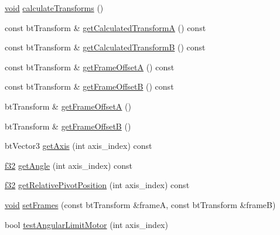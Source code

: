 \begin{DoxyCompactItemize}
\item 
\mbox{\hyperlink{_thread_8h_af1e856da2e658414cb2456cb6f7ebc66}{void}} \mbox{\hyperlink{classnjli_1_1_physics_constraint_generic6_dof_a120abacab53cf4dcf4b97241dc8a59b8}{calculate\+Transforms}} ()
\item 
const bt\+Transform \& \mbox{\hyperlink{classnjli_1_1_physics_constraint_generic6_dof_ae240be2b376857039701ff15e7304c94}{get\+Calculated\+TransformA}} () const
\item 
const bt\+Transform \& \mbox{\hyperlink{classnjli_1_1_physics_constraint_generic6_dof_a62448d0b780fa3c40b7d8a3b38458533}{get\+Calculated\+TransformB}} () const
\item 
const bt\+Transform \& \mbox{\hyperlink{classnjli_1_1_physics_constraint_generic6_dof_a47e2abdae640363408d6b65abe8abeac}{get\+Frame\+OffsetA}} () const
\item 
const bt\+Transform \& \mbox{\hyperlink{classnjli_1_1_physics_constraint_generic6_dof_a9831341ba2e4ed3fda9f4c0daf48bd03}{get\+Frame\+OffsetB}} () const
\item 
bt\+Transform \& \mbox{\hyperlink{classnjli_1_1_physics_constraint_generic6_dof_a5c522c9fc645e001c74d78d435fc31a9}{get\+Frame\+OffsetA}} ()
\item 
bt\+Transform \& \mbox{\hyperlink{classnjli_1_1_physics_constraint_generic6_dof_a2f64146e62a92c8aca2127a3e9038084}{get\+Frame\+OffsetB}} ()
\item 
bt\+Vector3 \mbox{\hyperlink{classnjli_1_1_physics_constraint_generic6_dof_a3cada42a66e9341e7fb75e3bedab031b}{get\+Axis}} (int axis\+\_\+index) const
\item 
\mbox{\hyperlink{_util_8h_a5f6906312a689f27d70e9d086649d3fd}{f32}} \mbox{\hyperlink{classnjli_1_1_physics_constraint_generic6_dof_ae933d3bad2ab5614a25c8afbc79eda7a}{get\+Angle}} (int axis\+\_\+index) const
\item 
\mbox{\hyperlink{_util_8h_a5f6906312a689f27d70e9d086649d3fd}{f32}} \mbox{\hyperlink{classnjli_1_1_physics_constraint_generic6_dof_a80989ad0ca61c764fc63c9404229cbd6}{get\+Relative\+Pivot\+Position}} (int axis\+\_\+index) const
\item 
\mbox{\hyperlink{_thread_8h_af1e856da2e658414cb2456cb6f7ebc66}{void}} \mbox{\hyperlink{classnjli_1_1_physics_constraint_generic6_dof_ad0fd838dfb528aa5d473236951452a93}{set\+Frames}} (const bt\+Transform \&frameA, const bt\+Transform \&frameB)
\item 
bool \mbox{\hyperlink{classnjli_1_1_physics_constraint_generic6_dof_a510f7c50e1db34da7587e29be21cd95c}{test\+Angular\+Limit\+Motor}} (int axis\+\_\+index)

\end{DoxyCompactItemize}
